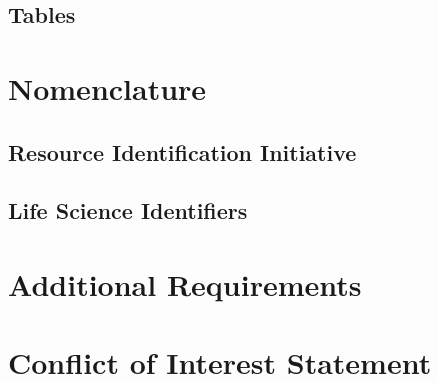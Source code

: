 \documentclass[utf8]{frontiersSCNS} %
\begin{document}
\subsection{Tables}

\section{Nomenclature}

\subsection{Resource Identification Initiative}

\subsection{Life Science Identifiers}


\section{Additional Requirements}

\section*{Conflict of Interest Statement}
\end{document}
